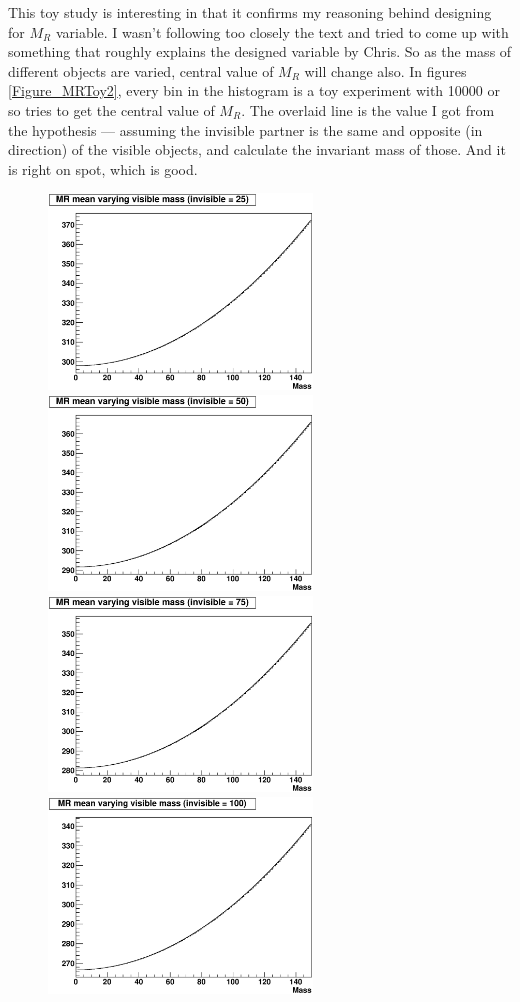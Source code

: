 \documentclass{fheadnote}
\begin{document}
This toy study is interesting in that it confirms my reasoning behind designing for $M_R$ variable.
I wasn't following too closely the text and tried to come up with something that roughly explains the designed variable by Chris.
So as the mass of different objects are varied, central value of $M_R$ will change also.
In figures \ref{Figure_MRToy2}, every bin in the histogram is a toy experiment with 10000 or so tries to get the
central value of $M_R$.
The overlaid line is the value I got from the hypothesis --- assuming the invisible partner is the same and opposite (in direction) of
the visible objects, and calculate the invariant mass of those.
And it is right on spot, which is good.

\begin{figure}[htbp]
   \centering
   \includegraphics[width=7cm]{Figures/MRToy2_Summary1}
   \includegraphics[width=7cm]{Figures/MRToy2_Summary2}\\
   \includegraphics[width=7cm]{Figures/MRToy2_Summary3}
   \includegraphics[width=7cm]{Figures/MRToy2_Summary4}

\end{figure}
\end{document}
